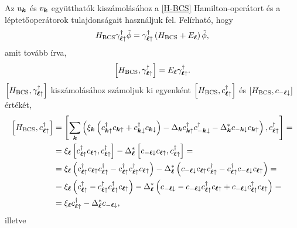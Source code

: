\documentclass[a4paper,12pt,titlepage]{article}
\newcommand{\KK}{{\vb*{k}}}
\newcommand{\LL}{{\vb*{\ell}}}
\begin{document}
Az $u_\KK$ és $v_\KK$ együtthatók kiszámolásához a \eqref{H-BCS} Hamilton-operátort és a léptetőoperátorok tulajdonságait használjuk fel.  Felírható, hogy
\begin{equation}
	H_\text{BCS} \gamma_{\LL \uparrow}^\dagger \tilde{\phi} = \gamma_{\LL \uparrow}^\dagger \left( H_\text{BCS} + E_\LL \right) \tilde{\phi},
\end{equation}
amit tovább írva,
\begin{equation}
	\left[ H_\text{BCS}, \gamma_{\LL \uparrow}^\dagger \right] = E_\LL \gamma_{\LL \uparrow}^\dagger.
\end{equation}
$\left[ H_\text{BCS}, \gamma_{\LL \uparrow}^\dagger \right]$ kiszámolásához számoljuk ki egyenként $\left[ H_\text{BCS}, c_{\LL \uparrow}^\dagger \right]$ és $\left[ H_\text{BCS}, c_{-\LL \downarrow} \right]$ értékét,
\begin{equation}
\begin{split}
	\left[ H_\text{BCS}, c_{\LL \uparrow}^\dagger \right] & = \left[ \sum\limits_\KK \left(\xi_\KK \left( c_{\KK \uparrow}^\dagger c_{\KK \uparrow} + c_{\KK \downarrow}^\dagger c_{\KK \downarrow} \right) - \Delta_\KK c_{\KK \uparrow}^\dagger c_{-\KK \downarrow}^\dagger - \Delta_\KK^* c_{-\KK \downarrow} c_{\KK \uparrow} \right), c_{\LL \uparrow}^\dagger \right] = \\
	& = \xi_\LL \left[ c_{\LL \uparrow}^\dagger c_{\LL \uparrow}, c_{\LL \uparrow}^\dagger \right] - \Delta_\LL^* \left[ c_{-\LL \downarrow} c_{\LL \uparrow}, c_{\LL \uparrow}^\dagger \right] = \\
	& = \xi_\LL \left( c_{\LL \uparrow}^\dagger c_{\LL \uparrow} c_{\LL \uparrow}^\dagger - c_{\LL \uparrow}^\dagger c_{\LL \uparrow}^\dagger c_{\LL \uparrow} \right) - \Delta_\LL^* \left( c_{-\LL \downarrow} c_{\LL \uparrow} c_{\LL \uparrow}^\dagger - c_{\LL \uparrow}^\dagger c_{-\LL \downarrow} c_{\LL \uparrow} \right) = \\
	& = \xi_\LL \left( c_{\LL \uparrow}^\dagger - c_{\LL \uparrow}^\dagger c_{\LL \uparrow}^\dagger c_{\LL \uparrow} \right) - \Delta_\LL^* \left( c_{-\LL \downarrow} - c_{-\LL \downarrow} c_{\LL \uparrow}^\dagger c_{\LL \uparrow} + c_{-\LL \downarrow} c_{\LL \uparrow}^\dagger c_{\LL \uparrow} \right) = \\
	& = \xi_\LL c_{\LL \uparrow}^\dagger - \Delta_\LL^* c_{-\LL \downarrow},
\end{split}
\end{equation}
illetve
\end{document}
